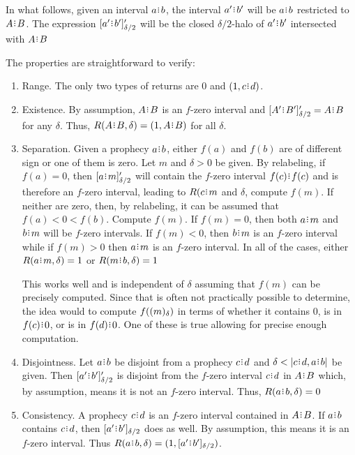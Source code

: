 \documentclass[12pt]{article}
\begin{document}
In what follows, given an interval $a\rint b$, the interval $a'\rint b'$ will be $a\rint b$ restricted to $A\rint B$. The expression $\clhalo[\delta/2]{a' \rint b'}'$ will be the closed $\delta/2$-halo of $a'\rint b'$ intersected with $A\rint B$

The properties are straightforward to verify:

\begin{enumerate}
\item Range. The only two types of returns are $0$ and $(1, c \rint d)$. 

\item Existence. By assumption, $A \rint B$ is an $f$-zero interval and $\clhalo[\delta/2]{A'\rint B'}' = A \rint B$ for any $\delta$. Thus, $R(A \rint B, \delta) = (1, A \rint B)$ for all $\delta$. 

\item Separation. Given a prophecy $a \rint b$, either $f(a)$ and $f(b)$ are of different sign or one of them is zero. Let $m$ and $\delta > 0$ be given. By relabeling, if $f(a) =0$, then $\clhalo[\delta/2]{a\rint m}'$ will contain the $f$-zero interval $f(c)\rint f(c)$ and is therefore an $f$-zero interval, leading to $R(c\rint m$ and $\delta$, compute $f(m)$. If neither are zero, then, by relabeling, it can be assumed that  $f(a) < 0 < f(b)$. Compute $f(m)$. If $f(m) = 0$, then both $a\rint m$ and $b\rint m$ will be $f$-zero intervals. If $f(m) < 0$, then $b\rint m$ is an $f$-zero interval while if $f(m) > 0$ then $a\rint m$ is an $f$-zero interval. In all of the cases, either $R(a\rint m, \delta) =1$ or $R(m\rint b, \delta) =1$

This works well and is independent of $\delta$ assuming that $f(m)$ can be precisely computed. Since that is often not practically possible to determine, the idea would to compute $f((m)_{\delta})$ in terms of whether it contains $0$, is in $f(c)\rint 0$, or is in $f(d)\rint 0$. One of these is true allowing for precise enough computation. 

\item Disjointness. Let $a \rint b$ be disjoint from a prophecy $c\rint d$ and $\delta < |c\rint d, a\rint b|$ be given. Then $\clhalo[\delta/2]{a'\rint b'}'$ is disjoint from the $f$-zero interval $c\rint d$ in $A\rint B$ which, by assumption, means it is not an $f$-zero interval. Thus, $R(a\rint b, \delta) = 0$

\item Consistency. A prophecy $c\rint d$ is an $f$-zero interval contained in $A \rint B$. If $a\rint b$ contains $c\rint d$, then $\clhalo[\delta/2]{a'\rint b'}$ does as well. By assumption, this means it is an $f$-zero interval. Thus $R(a\rint b, \delta) = (1, \clhalo[\delta/2]{a'\rint b'})$.


\end{enumerate}
\end{document}
